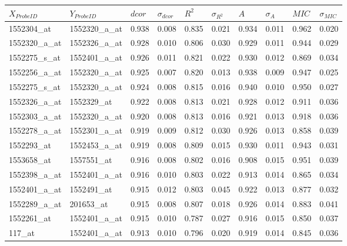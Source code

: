 \documentclass[a4paper, 12pt]{report}
\begin{document}
\begin{footnotesize}
\begin{longtable}{ | >{}m{2cm}| >{}m{2cm} | >{}m{0.8cm}| >{}m{0.8cm} |>{}m{0.8cm}| >{}m{0.8cm} |>{}m{0.8cm}| >{}m{0.8cm} |>{}m{0.8cm}| >{}m{0.8cm} |}
  \hline
\textbf{$X_{Probe ID}$} & \textbf{$Y_{ProbeID}$}  & \textbf{$dcor$} & \textbf{$\sigma_{dcor}$} & \textbf{$R^2$} & \textbf{$\sigma_{R^2}$}& \textbf{$A$} & \textbf{$\sigma_{A}$} & \textbf{$MIC$} & \textbf{$\sigma_{MIC}$}  \\ 
  \hline
1552304\_at & 1552320\_a\_at & 0.938 & 0.008 & 0.835 & 0.021 & 0.934 & 0.011 & 0.962 & 0.020 \\ 
  1552320\_a\_at & 1552326\_a\_at & 0.928 & 0.010 & 0.806 & 0.030 & 0.929 & 0.011 & 0.944 & 0.029 \\ 
  1552275\_s\_at & 1552401\_a\_at & 0.926 & 0.011 & 0.821 & 0.022 & 0.930 & 0.012 & 0.869 & 0.034 \\ 
  1552256\_a\_at & 1552320\_a\_at & 0.925 & 0.007 & 0.820 & 0.013 & 0.938 & 0.009 & 0.947 & 0.025 \\ 
  1552275\_s\_at & 1552320\_a\_at & 0.924 & 0.008 & 0.815 & 0.016 & 0.940 & 0.010 & 0.950 & 0.027 \\ 
  1552326\_a\_at & 1552329\_at & 0.922 & 0.008 & 0.813 & 0.021 & 0.928 & 0.012 & 0.911 & 0.036 \\ 
  1552303\_a\_at & 1552320\_a\_at & 0.920 & 0.008 & 0.813 & 0.016 & 0.921 & 0.013 & 0.918 & 0.036 \\ 
  1552278\_a\_at & 1552301\_a\_at & 0.919 & 0.009 & 0.812 & 0.030 & 0.926 & 0.013 & 0.858 & 0.039 \\ 
  1552293\_at & 1552453\_a\_at & 0.919 & 0.008 & 0.809 & 0.015 & 0.930 & 0.011 & 0.943 & 0.031 \\ 
  1553658\_at & 1557551\_at & 0.916 & 0.008 & 0.802 & 0.016 & 0.908 & 0.015 & 0.951 & 0.039 \\ 
  1552398\_a\_at & 1552401\_a\_at & 0.916 & 0.010 & 0.803 & 0.022 & 0.913 & 0.014 & 0.865 & 0.034 \\ 
  1552401\_a\_at & 1552491\_at & 0.915 & 0.012 & 0.803 & 0.045 & 0.922 & 0.013 & 0.877 & 0.032 \\ 
  1552289\_a\_at & 201653\_at & 0.915 & 0.008 & 0.807 & 0.018 & 0.926 & 0.014 & 0.883 & 0.041 \\ 
  1552261\_at & 1552401\_a\_at & 0.915 & 0.010 & 0.787 & 0.027 & 0.916 & 0.015 & 0.850 & 0.037 \\ 
  117\_at & 1552401\_a\_at & 0.913 & 0.010 & 0.796 & 0.020 & 0.919 & 0.014 & 0.845 & 0.036 \\ 

\end{longtable}
\end{footnotesize}
\end{document}
